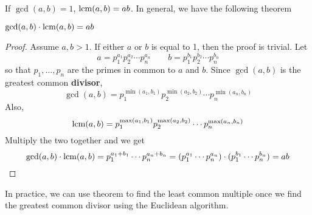 If $\gcd(a,b) = 1$, $\mathrm{lcm}(a,b) = ab$. In general, we have the following theorem

\begin{theorem}
    $
    \gcd(a,b) \cdot \mathrm{lcm}(a,b) = ab
    $
\end{theorem}

\begin{proof}
    Assume $a,b > 1$. If either $a$ or $b$ is equal to 1, then the proof is trivial. Let
    $$
    a = p_1^{a_1} p_2^{a_2} \cdots p_n^{a_n} \qquad b = p_1^{b_1} p_2^{b_2} \cdots p_n^{b_n}
    $$
    so that $p_1,\ldots,p_n$ are the primes in common to $a$ and $b$. Since $\gcd(a,b)$ is the greatest common \textbf{divisor},
    $$
    \gcd(a,b) = p_1^{\min(a_1,b_1)} p_2^{\min(a_2,b_2)} \cdots p_n^{\min(a_n,b_n)}
    $$
    Also,
    $$
    \mathrm{lcm}(a,b) = p_1^{\max(a_1,b_1)} p_2^{\max(a_2,b_2)} \cdots p_n^{\max(a_n,b_n)}
    $$
    Multiply the two together and we get
    $$
    \gcd(a,b) \cdot \mathrm{lcm}(a,b) = p_1^{a_1+b_1} \cdots p_n^{a_n + b_n} = (p_1^{a_1} \cdots p_n^{a_n}) \cdot (p_1^{b_1} \cdots p_n^{b_n}) = ab
    $$
\end{proof}

In practice, we can use theorem to find the least common multiple once we find the greatest common divisor using the Euclidean algorithm.
